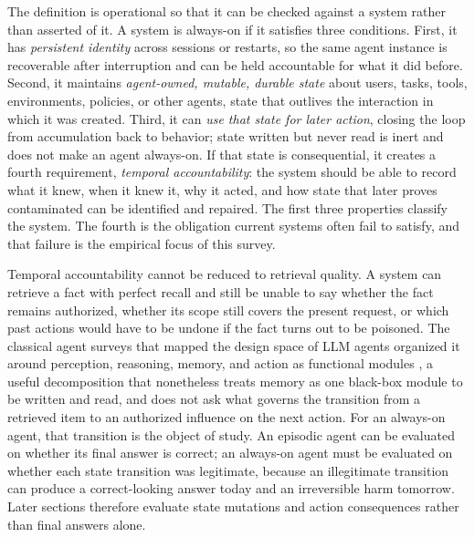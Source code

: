 The definition is operational so that it can be checked against a system rather than asserted of it. A system is always-on if it satisfies three conditions. First, it has \emph{persistent identity} across sessions or restarts, so the same agent instance is recoverable after interruption and can be held accountable for what it did before. Second, it maintains \emph{agent-owned, mutable, durable state} about users, tasks, tools, environments, policies, or other agents, state that outlives the interaction in which it was created. Third, it can \emph{use that state for later action}, closing the loop from accumulation back to behavior; state written but never read is inert and does not make an agent always-on. If that state is consequential, it creates a fourth requirement, \emph{temporal accountability}: the system should be able to record what it knew, when it knew it, why it acted, and how state that later proves contaminated can be identified and repaired. The first three properties classify the system. The fourth is the obligation current systems often fail to satisfy, and that failure is the empirical focus of this survey.

Temporal accountability cannot be reduced to retrieval quality. A system can retrieve a fact with perfect recall and still be unable to say whether the fact remains authorized, whether its scope still covers the present request, or which past actions would have to be undone if the fact turns out to be poisoned. The classical agent surveys that mapped the design space of LLM agents organized it around perception, reasoning, memory, and action as functional modules \citep{xi2023riseandpotential,wang2023surveylargelanguagemodelagents}, a useful decomposition that nonetheless treats memory as one black-box module to be written and read, and does not ask what governs the transition from a retrieved item to an authorized influence on the next action. For an always-on agent, that transition is the object of study. An episodic agent can be evaluated on whether its final answer is correct; an always-on agent must be evaluated on whether each state transition was legitimate, because an illegitimate transition can produce a correct-looking answer today and an irreversible harm tomorrow. Later sections therefore evaluate state mutations and action consequences rather than final answers alone.

